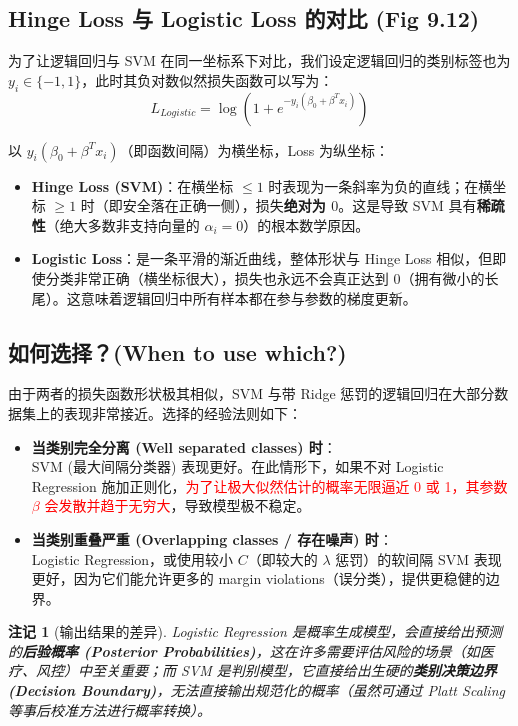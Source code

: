\documentclass[UTF8]{ctexart}
\newtheorem{remark}{注记}[section]
\numberwithin{equation}{section}
\begin{document}
\subsection{Hinge Loss 与 Logistic Loss 的对比 (Fig 9.12)}

为了让逻辑回归与 SVM 在同一坐标系下对比，我们设定逻辑回归的类别标签也为 $y_i \in \{-1, 1\}$，此时其负对数似然损失函数可以写为：
$$ L_{Logistic} = \log(1 + e^{-y_i(\beta_0 + \beta^T x_i)}) $$

以 $y_i(\beta_0 + \beta^T x_i)$（即函数间隔）为横坐标，Loss 为纵坐标：
\begin{itemize}
    \item \textbf{Hinge Loss (SVM)}：在横坐标 $\le 1$ 时表现为一条斜率为负的直线；在横坐标 $\ge 1$ 时（即安全落在正确一侧），损失\textbf{绝对为 $0$}。这是导致 SVM 具有\textbf{稀疏性}（绝大多数非支持向量的 $\alpha_i = 0$）的根本数学原因。
    \item \textbf{Logistic Loss}：是一条平滑的渐近曲线，整体形状与 Hinge Loss 相似，但即使分类非常正确（横坐标很大），损失也永远不会真正达到 $0$（拥有微小的长尾）。这意味着逻辑回归中所有样本都在参与参数的梯度更新。
\end{itemize}

\vspace{1em}

\subsection{如何选择？(When to use which?)}

由于两者的损失函数形状极其相似，SVM 与带 Ridge 惩罚的逻辑回归在大部分数据集上的表现非常接近。选择的经验法则如下：

\begin{itemize}
    \item \textbf{当类别完全分离 (Well separated classes) 时}：\\
    SVM (最大间隔分类器) 表现更好。在此情形下，如果不对 Logistic Regression 施加正则化，\textcolor{red}{为了让极大似然估计的概率无限逼近 0 或 1，其参数 $\beta$ 会发散并趋于无穷大}，导致模型极不稳定。
    
    \item \textbf{当类别重叠严重 (Overlapping classes / 存在噪声) 时}：\\
    Logistic Regression，或使用较小 $C$（即较大的 $\lambda$ 惩罚）的软间隔 SVM 表现更好，因为它们能允许更多的 margin violations（误分类），提供更稳健的边界。
\end{itemize}

\begin{remark}[输出结果的差异]
Logistic Regression 是概率生成模型，会直接给出预测的\textbf{后验概率 (Posterior Probabilities)}，这在许多需要评估风险的场景（如医疗、风控）中至关重要；而 SVM 是判别模型，它直接给出生硬的\textbf{类别决策边界 (Decision Boundary)}，无法直接输出规范化的概率（虽然可通过 Platt Scaling 等事后校准方法进行概率转换）。
\end{remark}
\end{document}
